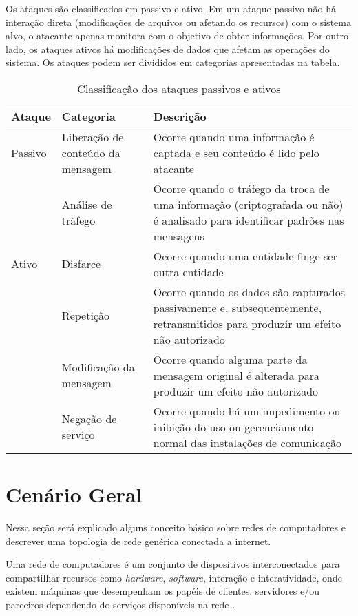 Os ataques são classificados em passivo e ativo. Em um ataque passivo não há interação direta (modificações de arquivos ou afetando os recursos) com o sistema alvo, o atacante apenas monitora com o objetivo de obter informações. Por outro lado, os ataques ativos há modificações de dados que afetam as operações do sistema. Os ataques podem ser divididos em categorias apresentadas na tabela.

\begin{table}[htb]
\ABNTEXfontereduzida
\centering
\caption{Classificação dos ataques passivos e ativos}
\label{tab:tipos-de-ataques}
\begin{tabular}{|l|l|p{7cm}|}
    \hline
    \textbf{Ataque} & \textbf{Categoria} & \textbf{Descrição} \\
    \hline
    Passivo & Liberação de conteúdo da mensagem & Ocorre quando uma informação é captada e seu conteúdo é lido pelo atacante \\ 
    \hline
            & Análise de tráfego & Ocorre quando o tráfego da troca de uma informação (criptografada ou não) é analisado para identificar padrões nas mensagens \\
    \hline
    Ativo & Disfarce & Ocorre quando uma entidade finge ser outra entidade \\
    \hline
          & Repetição & Ocorre quando os dados são capturados passivamente e, subsequentemente, retransmitidos para produzir um efeito não autorizado \\
    \hline
          & Modificação da mensagem & Ocorre quando alguma parte da mensagem original é alterada para produzir um efeito não autorizado \\
    \hline
          & Negação de serviço & Ocorre quando há um impedimento ou inibição do uso ou gerenciamento normal das instalações de comunicação \\
    \hline
\end{tabular}
\end{table}

\section{Cenário Geral} \label{sec:cenario-geral}

Nessa seção será explicado alguns conceito básico sobre redes de computadores e descrever uma topologia de rede genérica conectada a internet.

Uma rede de computadores é um conjunto de dispositivos interconectados para compartilhar recursos como \textit{hardware}, \textit{software}, interação e interatividade, onde existem máquinas que desempenham os papéis de clientes, servidores e/ou parceiros dependendo do serviços disponíveis na rede \cite{modelo:jose}.

